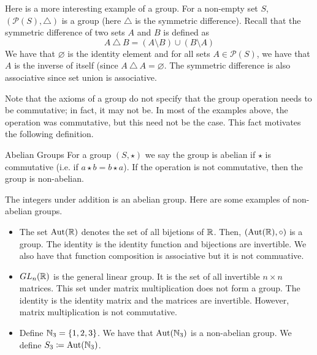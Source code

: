 \documentclass[main.tex]{subfiles}
\begin{document}
    \begin{example}{}{}
        Here is a more interesting example of a group. For a non-empty set $S$, $(\mathcal{P}(S), \triangle)$ is a group (here $\triangle$ is the symmetric difference). Recall that the symmetric difference of two sets $A$ and $B$ is defined as 
        \begin{equation}
            A\ \triangle\ B = (A\setminus B) \cup (B\setminus A)
        \end{equation}
        We have that $\varnothing$ is the identity element and for all sets $A \in \mathcal{P}(S)$, we have that $A$ is the inverse of itself (since $A\ \triangle\ A = \varnothing$. The symmetric difference is also associative since set union is associative.
    \end{example}
    Note that the axioms of a group do not specify that the group operation needs to be commutative; in fact, it may not be. In most of the examples above, the operation was commutative, but this need not be the case. This fact motivates the following definition.

    \begin{defn}{Abelian Groups}{}
        For a group $(S, \star)$ we say the group is abelian if $\star$ is commutative (i.e. if $a\star b = b\star a$). If the operation is not commutative, then the group is non-abelian. 
    \end{defn}

    \begin{example}{}{}
        The integers under addition is an abelian group. Here are some examples of non-abelian groups. 
        \begin{itemize}
            \item The set $\operatorname{Aut}(\mathbb{R})$ denotes the set of all bijetions of $\mathbb{R}$. Then, $(\operatorname{Aut}(\mathbb{R}), \circ)$ is a group. The identity is the identity function and bijections are invertible. We also have that function composition is associative but it is not commuative. 

            \item $GL_n(\mathbb{R})$ is the general linear group. It is the set of all invertible $n\times n$ matrices. This set under matrix multiplication does not form a group. The identity is the identity matrix and the matrices are invertible. However, matrix multiplication is not commutative. 

            \item Define $\mathbb{N}_3 = \{1, 2, 3\}$. We have that $\operatorname{Aut}(\mathbb{N}_3)$ is a non-abelian group. We define $S_3 \coloneqq \operatorname{Aut}(\mathbb{N}_3)$. 
        \end{itemize}
    \end{example}
\end{document}
